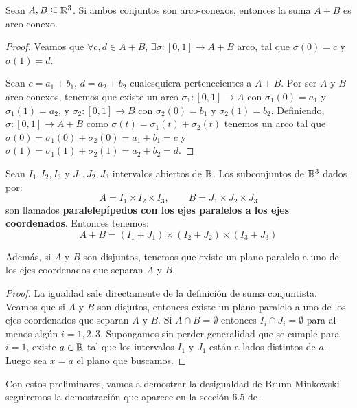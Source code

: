 \begin{lemma}
Sean $A,B \subseteq \mathbb{R}^3$. Si ambos conjuntos son arco-conexos, entonces la suma $A+B$ es arco-conexo.
\end{lemma}
\begin{proof}
Veamos que $\forall c,d \in A+B$, $\exists \sigma: [0,1] \longrightarrow A+B$ arco, tal que $\sigma(0)=c$ y $\sigma(1)=d$.

Sean $c=a_1 + b_1$, $d=a_2+b_2$ cualesquiera pertenecientes a $A+B$. Por ser $A$ y $B$ arco-conexos, tenemos que existe un arco $\sigma_1: [0,1] \longrightarrow A$ con $\sigma_1(0)=a_1$ y $\sigma_1(1)=a_2$, y $\sigma_2: [0,1] \longrightarrow B$ con $\sigma_2(0)=b_1$ y $\sigma_2(1)=b_2$. Definiendo, $\sigma: [0,1] \longrightarrow A+B$ como $\sigma(t) = \sigma_1(t) + \sigma_2(t)$ tenemos un arco tal que $\sigma(0)=\sigma_1(0) + \sigma_2(0) = a_1+b_1 = c$ y $\sigma(1)=\sigma_1(1) + \sigma_2(1) = a_2+b_2 = d$.
\end{proof}

\begin{lemma}\label{paralelepipedoslemma}
Sean $I_1, I_2, I_3$ y $J_1, J_2, J_3$ intervalos abiertos de $\mathbb{R}$. Los subconjuntos de $\mathbb{R}^3$ dados por:
%
\begin{equation*}
    A = I_1 \times I_2 \times I_3, \qquad B = J_1 \times J_2 \times J_3
\end{equation*}
%
son llamados \textbf{paralelepípedos con los ejes paralelos a los ejes coordenados}. Entonces tenemos:
%
\begin{equation*}
    A + B = (I_1 + J_1) \times (I_2 + J_2) \times (I_3 + J_3)
\end{equation*}

Además, si $A$ y $B$ son disjuntos, tenemos que existe un plano paralelo a uno de los ejes coordenados que separan $A$ y $B$.
\end{lemma}
\begin{proof}
La igualdad sale directamente de la definición de suma conjuntista.
Veamos que si $A$ y $B$ son disjutos, entonces existe un plano paralelo a uno de los ejes coordenados que separan $A$ y $B$. Si $A \cap B = \emptyset$ entonces $I_i \cap J_i = \emptyset$ para al menos algún $i = 1,2,3$. Supongamos sin perder generalidad que se cumple para $i=1$, existe $a \in \mathbb{R}$ tal que los intervalos $I_1$ y $J_1$ están a lados distintos de $a$. Luego sea $x=a$ el plano que buscamos.
\end{proof}

Con estos preliminares, vamos a demostrar la desigualdad de Brunn-Minkowski seguiremos la demostración que aparece en la sección 6.5 de \cite{montielrosbook}.

